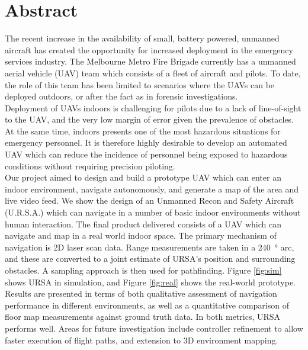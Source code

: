 \documentclass[capstone_report.tex]{subfiles}
\begin{document}
\chapter*{Abstract}                                
The recent increase in the availability of small, battery powered, unmanned aircraft has created the opportunity for increased deployment in the emergency services industry. The Melbourne Metro Fire Brigade currently has a unmanned aerial vehicle (UAV) team which consists of a fleet of aircraft and pilots. To date, the role of this team has been limited to scenarios where the UAVs can be deployed outdoors, or after the fact as in forensic investigations.\\

Deployment of UAVs indoors is challenging for pilots due to a lack of line-of-sight to the UAV, and the very low margin of error given the prevalence of obstacles. At the same time, indoors presents one of the most hazardous situations for emergency personnel. It is therefore highly desirable to develop an automated UAV which can reduce the incidence of personnel being exposed to hazardous conditions without requiring precision piloting.\\

Our project aimed to design and build a prototype UAV which can enter an indoor environment, navigate autonomously, and generate a map of the area and live video feed. We show the design of an Unmanned Recon and Safety Aircraft (U.R.S.A.) which can navigate in a number of basic indoor environments without human interaction. The final product delivered consists of a UAV which can navigate and map in a real world indoor space. The primary mechanism of navigation is 2D laser scan data. Range measurements are taken in a \SI{240}{\degree} arc, and these are converted to a joint estimate of URSA's position and surrounding obstacles. A sampling approach is then used for pathfinding. Figure \ref{fig:sim} shows URSA in simulation, and Figure \ref{fig:real} shows the real-world prototype.\\ 

Results are presented in terms of both qualitative assessment of navigation performance in different environments, as well as a quantitative comparison of floor map measurements against ground truth data. In both metrics, URSA performs well. Areas for future investigation include controller refinement to allow faster execution of flight paths, and extension to 3D environment mapping.
\end{document}
